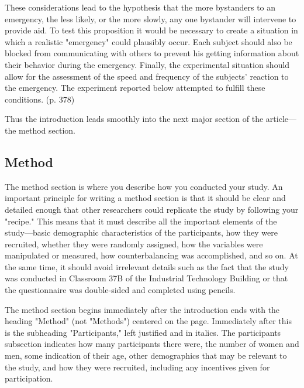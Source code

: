 These considerations lead to the hypothesis that the more bystanders to an emergency, the less likely, or the more slowly, any one bystander will intervene to provide aid. To test this proposition it would be necessary to create a situation in which a realistic "emergency" could plausibly occur. Each subject should also be blocked from communicating with others to prevent his getting information about their behavior during the emergency. Finally, the experimental situation should allow for the assessment of the speed and frequency of the subjects' reaction to the emergency. The experiment reported below attempted to fulfill these conditions. (p. 378)




Thus the introduction leads smoothly into the next major section of the article---the method section.




\subsection{Method}




The method section is where you describe how you conducted your study. An important principle for writing a method section is that it should be clear and detailed enough that other researchers could replicate the study by following your "recipe." This means that it must describe all the important elements of the study---basic demographic characteristics of the participants, how they were recruited, whether they were randomly assigned, how the variables were manipulated or measured, how counterbalancing was accomplished, and so on. At the same time, it should avoid irrelevant details such as the fact that the study was conducted in Classroom 37B of the Industrial Technology Building or that the questionnaire was double-sided and completed using pencils.




The method section begins immediately after the introduction ends with the heading "Method" (not "Methods") centered on the page. Immediately after this is the subheading "Participants," left justified and in italics. The participants subsection indicates how many participants there were, the number of women and men, some indication of their age, other demographics that may be relevant to the study, and how they were recruited, including any incentives given for participation.




